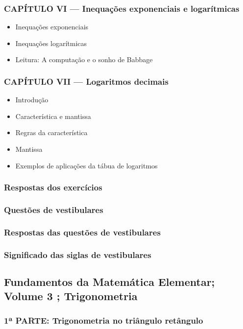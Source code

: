 \documentclass[a4paper,12pt]{article}[abntex2]
\begin{document}
\subsubsection*{CAPÍTULO VI — Inequações exponenciais e logarítmicas}

\begin{itemize}
\item Inequações exponenciais
\item Inequações logarítmicas
\item Leitura: A computação e o sonho de Babbage
\end{itemize}
\subsubsection*{CAPÍTULO VII — Logaritmos decimais}

\begin{itemize}
\item Introdução
\item Característica e mantissa
\item Regras da característica
\item Mantissa
\item Exemplos de aplicações da tábua de logaritmos
\end{itemize}
\subsubsection*{Respostas dos exercícios}

\subsubsection*{Questões de vestibulares}

\subsubsection*{Respostas das questões de vestibulares}

\subsubsection*{Significado das siglas de vestibulares}
 
 \subsection{Fundamentos da Matemática Elementar; Volume 3 ; Trigonometria}

\subsubsection*{1ª PARTE: Trigonometria no triângulo retângulo}
\end{document}
